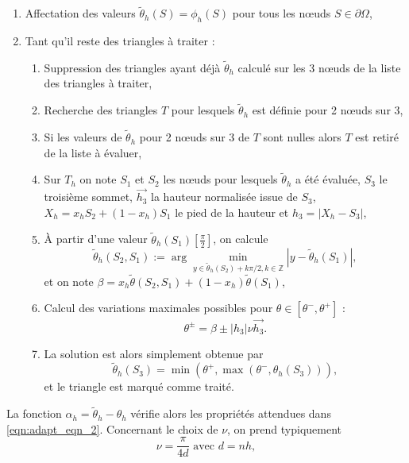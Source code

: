 \begin{enumerate}
    \item Affectation des valeurs $\tilde{\theta}_h(S) = \phi_h(S)$ pour tous les nœuds $S \in \partial\Omega$,\\
    \item Tant qu'il reste des triangles à traiter :\\
    \begin{enumerate}
        \item Suppression des triangles ayant déjà $\tilde{\theta}_h$ calculé sur les 3 nœuds de la liste des triangles à traiter,\\
        \item Recherche des triangles $T$ pour lesquels $\tilde{\theta}_h$ est définie pour 2 nœuds sur 3,\\
        \item Si les valeurs de $\tilde{\theta}_h$ pour 2 nœuds sur 3 de $T$ sont nulles alors $T$ est retiré de la liste à évaluer,\\
        \item Sur $T_h$ on note $S_1$ et $S_2$ les nœuds pour lesquels $\tilde{\theta}_h$ a été évaluée, $S_3$ le troisième sommet, $\overrightarrow{h_3}$ la hauteur normalisée issue de $S_3$, $X_h = x_hS_2 +(1-x_h)S_1$ le pied de la hauteur et $h_3 = |X_h - S_3|$,\\
        \item À partir d'une valeur $\tilde{\theta}_h(S_1) \left[ \frac{\pi}{2} \right]$, on calcule
        \[
        \tilde{\theta}_h(S_2, S_1) := \arg\min_{y\in{\tilde{\theta}_h(S_2)+k\pi/2, k\in\mathbb{Z}}}
        \left|y - \tilde{\theta}_h(S_1)\right|,
        \]
        et on note $\beta = x_h \tilde{\theta}(S_2, S_1) + (1 - x_h)\tilde{\theta}(S_1)$,\\
        \item Calcul des variations maximales possibles pour $\theta \in [\theta^-, \theta^+]$ :
        \[
        \theta^\pm = \beta \pm |h_3|\nu\overrightarrow{h_3}.
        \]
        \item La solution est alors simplement obtenue par
    \[
    \tilde{\theta}_h(S_3) = \min(\theta^+, \max(\theta^-, \theta_h(S_3))),
    \]
    et le triangle est marqué comme traité.
    \end{enumerate}
\end{enumerate}
La fonction $\alpha_h = \tilde{\theta}_h - \theta_h$ vérifie alors les propriétés attendues dans \eqref{eqn:adapt_eqn_2}. Concernant le choix de $\nu$, on prend typiquement
\[
\nu = \frac{\pi}{4d} \mbox{ avec } d = nh,
\]
